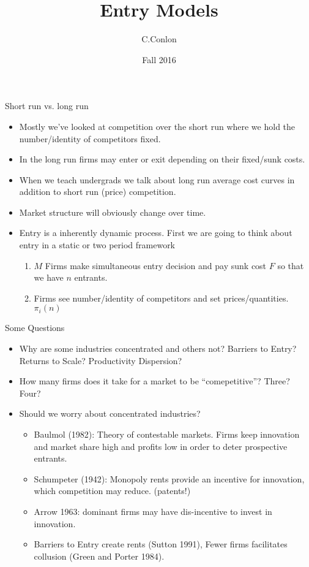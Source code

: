\documentclass[xcolor=pdftex,dvipsnames,table,mathserif]{beamer}
\title []{Entry Models}
\author{C.Conlon }
\institute{Grad IO }
\date{Fall 2016}
\begin{document}
\begin{frame}
\titlepage
\end{frame}



\begin{frame}{Short run vs. long run}
\begin{itemize}
\item Mostly we've looked at competition over the \alert{short run} where we hold the number/identity of competitors fixed.
\item In the \alert{long run} firms may enter or exit depending on their fixed/sunk costs.
\item When we teach undergrads we talk about \alert{long run average cost curves} in addition to short run (price) competition.
\item Market structure will obviously change over time.
\item Entry is a inherently dynamic process. First we are going to think about entry in a static or two period framework
\begin{enumerate}
\item $M$ Firms make simultaneous entry decision and pay sunk cost $F$ so that we have $n$ entrants.
\item Firms see number/identity of competitors and set prices/quantities. $\pi_i(n)$
\end{enumerate}
\end{itemize}
\end{frame} 


\begin{frame}{Some Questions}
\begin{itemize}
\item Why are some industries concentrated and others not? Barriers to Entry? Returns to Scale? Productivity Dispersion?
\item How many firms does it take for a market to be ``comepetitive''? Three? Four?
\item Should we worry about concentrated industries?
\begin{itemize}
\item Baulmol (1982): Theory of \alert{contestable} markets. Firms keep innovation and market share high and profits low in order to deter prospective entrants.
\item Schumpeter (1942): Monopoly rents provide an incentive for \alert{innovation}, which competition may reduce. (patents!)
\item Arrow 1963: dominant firms may have dis-incentive to invest in innovation.
\item Barriers to Entry create rents (Sutton 1991), Fewer firms facilitates collusion (Green and Porter 1984).
\end{itemize}
\end{itemize}
\end{frame} 
\end{document}
